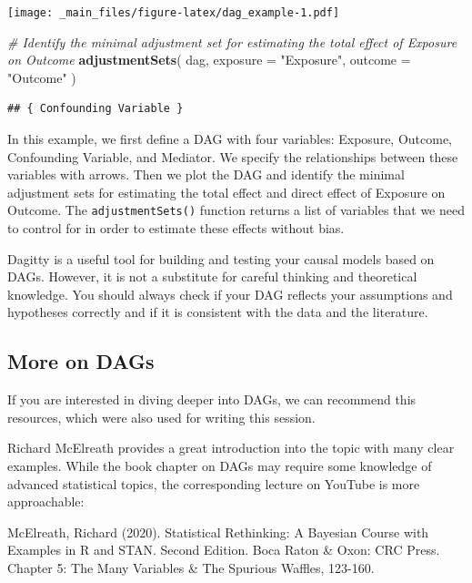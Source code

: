 \documentclass[
]{book}
\newenvironment{Shaded}{\begin{snugshade}}{\end{snugshade}}
\newcommand{\AttributeTok}[1]{\textcolor[rgb]{0.13,0.29,0.53}{#1}}
\newcommand{\CommentTok}[1]{\textcolor[rgb]{0.56,0.35,0.01}{\textit{#1}}}
\newcommand{\FunctionTok}[1]{\textcolor[rgb]{0.13,0.29,0.53}{\textbf{#1}}}
\newcommand{\NormalTok}[1]{#1}
\newcommand{\StringTok}[1]{\textcolor[rgb]{0.31,0.60,0.02}{#1}}
\begin{document}
\texttt{[image: \_main\_files/figure-latex/dag\_example-1.pdf]}

\begin{Shaded}
\begin{Highlighting}[]
\CommentTok{\# Identify the minimal adjustment set for estimating the total effect of Exposure on Outcome}
\FunctionTok{adjustmentSets}\NormalTok{( dag, }\AttributeTok{exposure =} \StringTok{"Exposure"}\NormalTok{, }\AttributeTok{outcome =} \StringTok{"Outcome"}\NormalTok{ )}
\end{Highlighting}
\end{Shaded}

\begin{verbatim}
## { Confounding Variable }
\end{verbatim}

In this example, we first define a DAG with four variables: Exposure, Outcome, Confounding Variable, and Mediator. We specify the relationships between these variables with arrows. Then we plot the DAG and identify the minimal adjustment sets for estimating the total effect and direct effect of Exposure on Outcome. The \texttt{adjustmentSets()} function returns a list of variables that we need to control for in order to estimate these effects without bias.

Dagitty is a useful tool for building and testing your causal models based on DAGs. However, it is not a substitute for careful thinking and theoretical knowledge. You should always check if your DAG reflects your assumptions and hypotheses correctly and if it is consistent with the data and the literature.

\hypertarget{more-on-dags}{%
\subsection{More on DAGs}\label{more-on-dags}}

If you are interested in diving deeper into DAGs, we can recommend this
resources, which were also used for writing this session.

Richard McElreath provides a great introduction into the topic with many clear
examples. While the book chapter on DAGs may require some knowledge of advanced
statistical topics, the corresponding lecture on YouTube is more approachable:

McElreath, Richard (2020). Statistical Rethinking: A Bayesian Course with
Examples in R and STAN. Second Edition. Boca Raton \& Oxon: CRC Press.
Chapter 5: The Many Variables \& The Spurious Waffles, 123-160.
\end{document}
